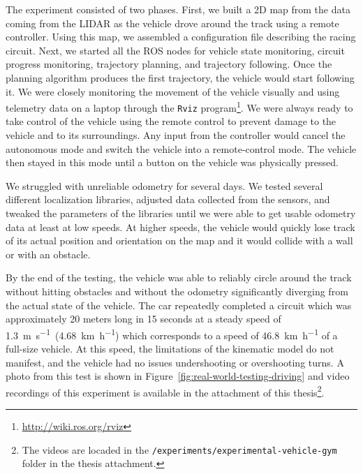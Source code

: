 The experiment consisted of two phases. First, we built a 2D map from the data coming from the \gls*{LIDAR} as the vehicle drove around the track using a remote controller. Using this map, we assembled a configuration file describing the racing circuit. Next, we started all the \gls{ROS} nodes for vehicle state monitoring, circuit progress monitoring, trajectory planning, and trajectory following. Once the planning algorithm produces the first trajectory, the vehicle would start following it. We were closely monitoring the movement of the vehicle visually and using telemetry data on a laptop through the \texttt{Rviz} program\footnote{\url{http://wiki.ros.org/rviz}}. We were always ready to take control of the vehicle using the remote control to prevent damage to the vehicle and to its surroundings. Any input from the controller would cancel the autonomous mode and switch the vehicle into a remote-control mode. The vehicle then stayed in this mode until a button on the vehicle was physically pressed.

We struggled with unreliable odometry for several days. We tested several different localization libraries, adjusted data collected from the sensors, and tweaked the parameters of the libraries until we were able to get usable odometry data at least at low speeds. At higher speeds, the vehicle would quickly lose track of its actual position and orientation on the map and it would collide with a wall or with an obstacle.

By the end of the testing, the vehicle was able to reliably circle around the track without hitting obstacles and without the odometry significantly diverging from the actual state of the vehicle. The car repeatedly completed a circuit which was approximately 20 meters long in 15 seconds at a steady speed of \SI{1.3}{\meter\per\second}~(\SI{4.68}{\kilo\meter\per\hour}) which corresponds to a speed of \SI{46.8}{\kilo\meter\per\hour} of a full-size vehicle. At this speed, the limitations of the kinematic model do not manifest, and the vehicle had no issues undershooting or overshooting turns. A photo from this test is shown in Figure~\ref{fig:real-world-testing-driving} and video recordings of this experiment is available in the attachment of this thesis\footnote{The videos are locaded in the \texttt{/experiments/experimental-vehicle-gym} folder in the thesis attachment.}.

